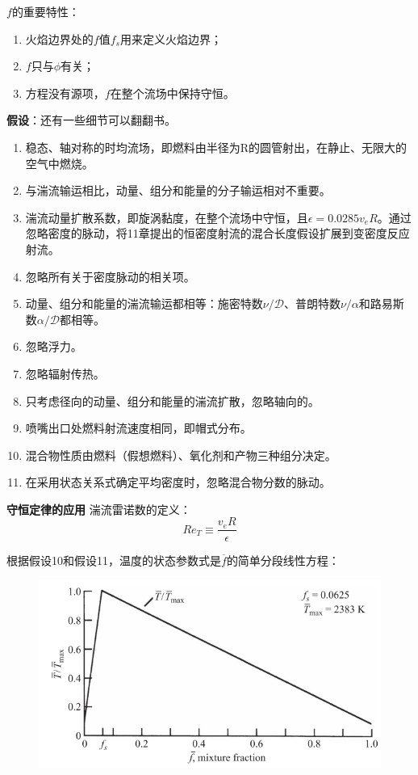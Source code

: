 \(f\)的重要特性：
\begin{enumerate}
    \item 火焰边界处的\(f\)值\(f_s\)用来定义火焰边界；
    \item \(f\)只与\(\phi\)有关；
    \item 方程没有源项，\(f\)在整个流场中保持守恒。
\end{enumerate}

\textbf{假设}：还有一些细节可以翻翻书。

\begin{multicols}{2}
    \tiny
    \begin{enumerate}
        \item 稳态、轴对称的时均流场，即燃料由半径为R的圆管射出，在静止、无限大的空气中燃烧。
        \item 与湍流输运相比，动量、组分和能量的分子输运相对不重要。
        \item 湍流动量扩散系数，即旋涡黏度，在整个流场中守恒，且\(\epsilon=0.0285 v_e R\)。通过忽略密度的脉动，将11章提出的恒密度射流的混合长度假设扩展到变密度反应射流。
        \item 忽略所有关于密度脉动的相关项。
        \item 动量、组分和能量的湍流输运都相等：施密特数\(\nu/\mathcal{D}\)、普朗特数\(\nu/\alpha\)和路易斯数\(\alpha/\mathcal{D}\)都相等。
        \item 忽略浮力。
        \item 忽略辐射传热。
        \item 只考虑径向的动量、组分和能量的湍流扩散，忽略轴向的。
        \item 喷嘴出口处燃料射流速度相同，即帽式分布。
        \item 混合物性质由燃料（假想燃料）、氧化剂和产物三种组分决定。
        \item 在采用状态关系式确定平均密度时，忽略混合物分数的脉动。
    \end{enumerate}
\end{multicols}

\textbf{守恒定律的应用}
湍流雷诺数的定义：
\begin{equation}
    Re_T \equiv \frac{v_e R}{\epsilon}
\end{equation}

根据假设10和假设11，温度的状态参数式是\(\overline{f}\)的简单分段线性方程：
\begin{figure}[H]
    \includegraphics[width=.3\textwidth]{img/f_vs_t.png}
\end{figure}

